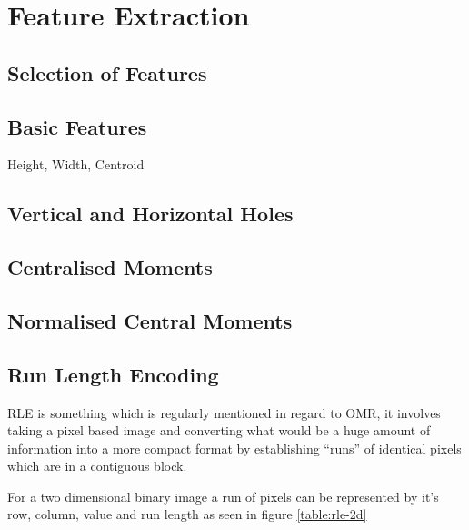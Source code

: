 \section{Feature Extraction}

\subsection{Selection of Features}

\subsection{Basic Features}
Height, Width, Centroid

\subsection{Vertical and Horizontal Holes}

\subsection{Centralised Moments}

\subsection{Normalised Central Moments}

\subsection{Run Length Encoding}
\label{sec:tb-rle}

\acrfull{RLE} is something which is regularly mentioned in regard to OMR, it involves taking a pixel based image and converting what would be a huge amount of information into a more compact format by establishing ``runs'' of identical pixels which are in a contiguous block.

For a two dimensional binary image a run of pixels can be represented by it's row, column, value and run length \parencite[p. 27-28]{burger2009principles} as seen in figure \ref{table:rle-2d}

